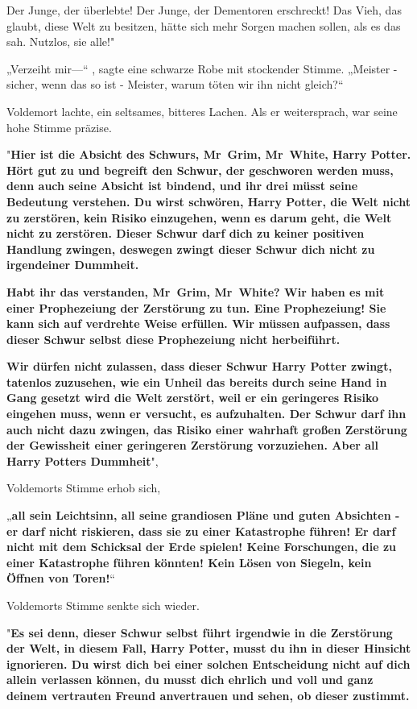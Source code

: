 {{Der Junge, der überlebte! Der Junge, der Dementoren erschreckt! Das Vieh, das glaubt, diese Welt zu besitzen, hätte sich mehr Sorgen machen sollen, als es das sah. Nutzlos, sie alle!}"

„Verzeiht mir—“ , sagte eine schwarze Robe mit stockender Stimme. „Meister - sicher, wenn das so ist - Meister, warum töten wir ihn nicht gleich?“

Voldemort lachte, ein seltsames, bitteres Lachen. Als er weitersprach, war seine hohe Stimme präzise.

"\textbf{Hier ist die Absicht des Schwurs, Mr~Grim, Mr~White, Harry Potter. Hört gut zu und begreift den Schwur, der geschworen werden muss, denn auch seine Absicht ist bindend, und ihr drei müsst seine Bedeutung verstehen. Du wirst schwören, Harry Potter, die Welt nicht zu zerstören, kein Risiko einzugehen, wenn es darum geht, die Welt nicht zu zerstören. Dieser Schwur darf dich zu keiner positiven Handlung zwingen, deswegen zwingt dieser Schwur dich nicht zu irgendeiner Dummheit.}

\textbf{Habt ihr das verstanden, Mr~Grim, Mr~White? Wir haben es mit einer Prophezeiung der Zerstörung zu tun. Eine Prophezeiung! Sie kann sich auf verdrehte Weise erfüllen. Wir müssen aufpassen, dass dieser Schwur selbst diese Prophezeiung nicht herbeiführt.}

\textbf{Wir dürfen nicht zulassen, dass dieser Schwur Harry Potter zwingt, tatenlos} \textbf{zuzusehen, wie ein Unheil das bereits durch seine Hand in Gang gesetzt wird die Welt zerstört, weil er ein geringeres Risiko eingehen muss, wenn er versucht, es aufzuhalten. Der Schwur darf ihn auch nicht dazu zwingen, das Risiko einer wahrhaft großen Zerstörung der Gewissheit einer geringeren Zerstörung vorzuziehen. Aber all Harry Potters Dummheit}",

Voldemorts Stimme erhob sich,

„\textbf{all sein Leichtsinn, all seine grandiosen Pläne und guten Absichten - er darf nicht riskieren, dass sie zu einer Katastrophe führen! Er darf nicht mit dem Schicksal der Erde spielen! Keine Forschungen, die zu einer Katastrophe führen könnten! Kein Lösen von Siegeln, kein Öffnen von Toren!}“

Voldemorts Stimme senkte sich wieder.

"\textbf{Es sei denn, dieser Schwur selbst führt irgendwie in die Zerstörung der Welt, in diesem Fall, Harry Potter, musst du ihn in dieser Hinsicht ignorieren. Du wirst dich bei einer solchen Entscheidung nicht auf dich allein verlassen können, du musst dich ehrlich und voll und ganz deinem vertrauten Freund anvertrauen und sehen, ob dieser zustimmt.}

}

